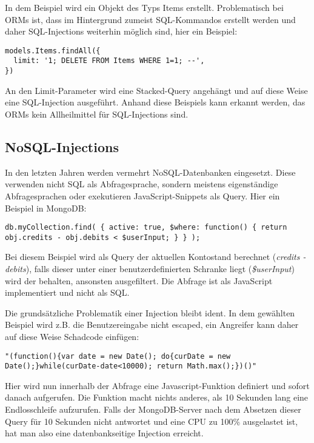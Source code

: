 In dem Beispiel wird ein Objekt des Typs Items erstellt. Problematisch bei ORMs ist, dass im Hintergrund zumeist SQL-Kommandos erstellt werden und daher SQL-Injections weiterhin möglich sind, hier ein Beispiel:

\begin{verbatim}
models.Items.findAll({
  limit: '1; DELETE FROM Items WHERE 1=1; --',
})
\end{verbatim}

An den Limit-Parameter wird eine Stacked-Query angehängt und auf diese Weise eine SQL-Injection ausgeführt. Anhand diese Beispiels kann erkannt werden, das ORMs kein Allheilmittel für SQL-Injections sind.

\subsection{NoSQL-Injections}

In den letzten Jahren werden vermehrt NoSQL-Datenbanken eingesetzt. Diese verwenden nicht SQL als Abfragesprache, sondern meistens eigenständige Abfragesprachen oder exekutieren JavaScript-Snippets als Query. Hier ein Beispiel in MongoDB:

\begin{verbatim}
db.myCollection.find( { active: true, $where: function() { return obj.credits - obj.debits < $userInput; } } );
\end{verbatim}

Bei diesem Beispiel wird als Query der aktuellen Kontostand berechnet (\textit{credits - debits}), falls dieser unter einer benutzerdefinierten Schranke liegt (\textit{\$userInput}) wird der behalten, ansonsten ausgefiltert. Die Abfrage ist als JavaScript implementiert und nicht als SQL.

Die grundsätzliche Problematik einer Injection bleibt ident. In dem gewählten Beispiel wird z.B. die Benutzereingabe nicht escaped, ein Angreifer kann daher auf diese Weise Schadcode einfügen:

\begin{verbatim}
"(function(){var date = new Date(); do{curDate = new Date();}while(curDate-date<10000); return Math.max();})()"
\end{verbatim}

Hier wird nun innerhalb der Abfrage eine Javascript-Funktion definiert und sofort danach aufgerufen. Die Funktion macht nichts anderes, als 10 Sekunden lang eine Endlosschleife aufzurufen. Falls der MongoDB-Server nach dem Absetzen dieser Query für 10 Sekunden nicht antwortet und eine CPU zu 100\% ausgelastet ist, hat man also eine datenbankseitige Injection erreicht.

